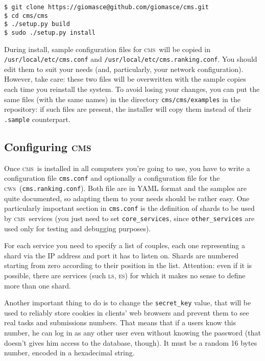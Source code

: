 \documentclass[a4paper,8pt]{amsart}
\newcommand{\CMS}{\textsc{cms}}
\newcommand{\LS}{\textsc{ls}}
\newcommand{\ES}{\textsc{es}}
\newcommand{\CWS}{\textsc{cws}}
\newcommand{\id}[1]{\texttt{#1}}
\newcommand{\file}[1]{\texttt{#1}}
\begin{document}
\begin{multicols}{2}
\begin{verbatim}
$ git clone https://giomasce@github.com/giomasce/cms.git
$ cd cms/cms
$ ./setup.py build
$ sudo ./setup.py install
\end{verbatim}

  During install, sample configuration files for \CMS\ will be copied
  in \file{/usr/local/etc/cms.conf} and
  \file{/usr/local/etc/cms.ranking.conf}. You should edit them to suit
  your needs (and, particularly, your network configuration). However,
  take care: these two files will be overwritten with the sample
  copies each time you reinstall the system. To avoid losing your
  changes, you can put the same files (with the same names) in the
  directory \file{cms/cms/examples} in the repository: if such files
  are present, the installer will copy them instead of their
  \file{.sample} counterpart.

  \subsection{Configuring \CMS}

  Once \CMS\ is installed in all computers you're going to use, you
  have to write a configuration file \file{cms.conf} and optionally a
  configuration file for the \CWS\ (\file{cms.ranking.conf}). Both
  file are in YAML format and the samples are quite documented, so
  adapting them to your needs should be rather easy. One particularly
  important section in \file{cms.conf} is the definition of shards to
  be used by \CMS\ services (you just need to set \id{core\_services},
  since \id{other\_services} are used only for testing and debugging
  purposes).

  For each service you need to specify a list of couples, each one
  representing a shard via the IP address and port it has to listen
  on. Shards are numbered starting from zero according to their
  position in the list. Attention: even if it is possible, there are
  services (such \LS, \ES) for which it makes no sense to define more
  than one shard.

  Another important thing to do is to change the \id{secret\_key}
  value, that will be used to reliably store cookies in clients' web
  browsers and prevent them to see real tasks and submissions
  numbers. That means that if a users know this number, he can log in
  as any other user even without knowing the password (that doesn't
  gives him access to the database, though). It must be a random 16
  bytes number, encoded in a hexadecimal string.


\end{multicols}
\end{document}
